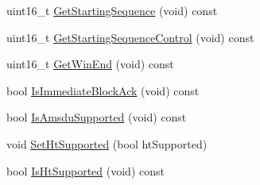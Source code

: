\begin{DoxyCompactItemize}
\item 
uint16\+\_\+t \hyperlink{classns3_1_1BlockAckAgreement_a53ab5ce81dd04cb182ae35a388db813d}{Get\+Starting\+Sequence} (void) const 
\item 
uint16\+\_\+t \hyperlink{classns3_1_1BlockAckAgreement_a015e0c397299a0943c19ee842317dea4}{Get\+Starting\+Sequence\+Control} (void) const 
\item 
uint16\+\_\+t \hyperlink{classns3_1_1BlockAckAgreement_a4c8f625202aa43845f4ea540e8baaf08}{Get\+Win\+End} (void) const 
\item 
bool \hyperlink{classns3_1_1BlockAckAgreement_ab24486e2d0c2040d8df6010105ff992a}{Is\+Immediate\+Block\+Ack} (void) const 
\item 
bool \hyperlink{classns3_1_1BlockAckAgreement_ae8b046b0119d291ba9f5737c79c33f93}{Is\+Amsdu\+Supported} (void) const 
\item 
void \hyperlink{classns3_1_1BlockAckAgreement_af67389612196088dab0bc498630f7608}{Set\+Ht\+Supported} (bool ht\+Supported)
\item 
bool \hyperlink{classns3_1_1BlockAckAgreement_a677dae36f2c5d0bd4975f9f9243f1342}{Is\+Ht\+Supported} (void) const 
\end{DoxyCompactItemize}
